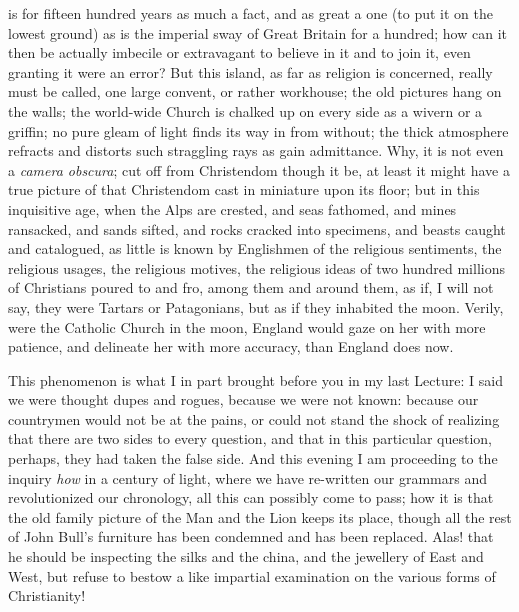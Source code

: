 is for fifteen hundred years as much a fact, and as great
a one (to put it on the lowest ground) as is the imperial
sway of Great Britain for a hundred; how can it then be
actually imbecile or extravagant to believe in it and to
join it, even granting it were an error? But this island,
as far as religion is concerned, really must be called,
one large convent, or rather workhouse; the old pictures
hang on the walls; the world-wide Church is chalked up on
every side as a wivern or a griffin; no pure gleam of
light finds its way in from without; the thick atmosphere
refracts and distorts such straggling rays as gain
admittance. Why, it is not even a \emph{camera obscura};
cut off from Christendom though it be, at least it might
have a true picture of that Christendom cast in miniature
upon its floor; but in this inquisitive age, when the
Alps are crested, and seas fathomed, and mines ransacked,
and sands sifted, and rocks cracked into specimens, and
beasts caught and catalogued, as little is known by
Englishmen of the religious sentiments, the religious
usages, the religious motives, the religious ideas of two
hundred millions of Christians poured to and fro, among
them and around them, as if, I will not say, they were
Tartars or Patagonians, but as if they inhabited the
moon. Verily, were the Catholic Church in the moon,
England would gaze on her with more patience, and
delineate her with more accuracy, than England does now.

This phenomenon is what I in part brought before you
in my last Lecture: I said we were thought dupes and
rogues, because we were not known: because our countrymen
would not be at the pains, or could not stand the shock
of realizing that there are two sides to every question,
and that in this particular question, perhaps, they had
taken the false side. And this evening I am proceeding to
the inquiry \emph{how} in a century of light, where we
have re-written our grammars and revolutionized our
chronology, all this can possibly come to pass; how it is
that the old family picture of the Man and the Lion keeps
its place, though all the rest of John Bull's furniture
has been condemned and has been replaced. Alas! that he
should be inspecting the silks and the china, and the
jewellery of East and West, but refuse to bestow a like
impartial examination on the various forms of
Christianity!

